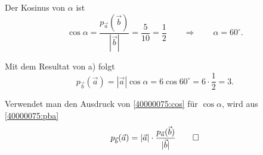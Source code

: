 \begin{loesung}
\begin{teilaufgaben}
\item
Der Kosinus von $\alpha$ ist
\begin{equation}
\cos\alpha
=
\frac{p_{\vec{a}}(\vec{b})}{|\vec{b}|}
=
\frac{5}{10}
=
\frac12
\qquad\Rightarrow\qquad
\alpha = 60^\circ.
\label{40000075:cos}
\end{equation}
\item Mit dem Resultat von a) folgt
\begin{equation}
p_{\vec{b}}(\vec{a})
=
|\vec{a}|\cos\alpha
=
6\cos 60^\circ
=
6\cdot\frac12
=
3.
\label{40000075:pba}
\end{equation}
\item
Verwendet man den Ausdruck von \eqref{40000075:cos} für $\cos\alpha$,
wird aus \eqref{40000075:pba}
\[
p_{\vec{b}}(\vec{a})
=
|\vec{a}|\cdot \frac{p_{\vec{a}}(\vec{b})}{|\vec{b}|}
\qedhere
\]
\end{teilaufgaben}
\end{loesung}

